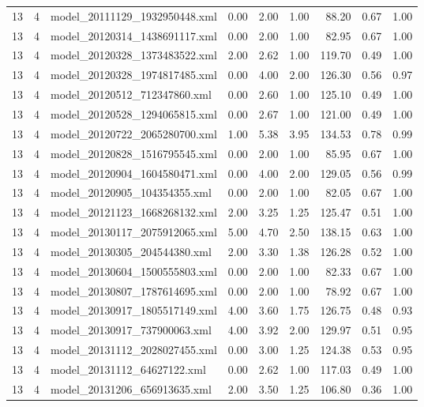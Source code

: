 \begin{table}[ht]
\begin{tabular}{rrlrrrrrr}
   13 &   4 & model\_20111129\_1932950448.xml & 0.00 & 2.00 & 1.00 & 88.20 & 0.67 & 1.00 \\ 
   13 &   4 & model\_20120314\_1438691117.xml & 0.00 & 2.00 & 1.00 & 82.95 & 0.67 & 1.00 \\ 
   13 &   4 & model\_20120328\_1373483522.xml & 2.00 & 2.62 & 1.00 & 119.70 & 0.49 & 1.00 \\ 
   13 &   4 & model\_20120328\_1974817485.xml & 0.00 & 4.00 & 2.00 & 126.30 & 0.56 & 0.97 \\ 
   13 &   4 & model\_20120512\_712347860.xml & 0.00 & 2.60 & 1.00 & 125.10 & 0.49 & 1.00 \\ 
   13 &   4 & model\_20120528\_1294065815.xml & 0.00 & 2.67 & 1.00 & 121.00 & 0.49 & 1.00 \\ 
   13 &   4 & model\_20120722\_2065280700.xml & 1.00 & 5.38 & 3.95 & 134.53 & 0.78 & 0.99 \\ 
   13 &   4 & model\_20120828\_1516795545.xml & 0.00 & 2.00 & 1.00 & 85.95 & 0.67 & 1.00 \\ 
   13 &   4 & model\_20120904\_1604580471.xml & 0.00 & 4.00 & 2.00 & 129.05 & 0.56 & 0.99 \\ 
   13 &   4 & model\_20120905\_104354355.xml & 0.00 & 2.00 & 1.00 & 82.05 & 0.67 & 1.00 \\ 
   13 &   4 & model\_20121123\_1668268132.xml & 2.00 & 3.25 & 1.25 & 125.47 & 0.51 & 1.00 \\ 
   13 &   4 & model\_20130117\_2075912065.xml & 5.00 & 4.70 & 2.50 & 138.15 & 0.63 & 1.00 \\ 
   13 &   4 & model\_20130305\_204544380.xml & 2.00 & 3.30 & 1.38 & 126.28 & 0.52 & 1.00 \\ 
   13 &   4 & model\_20130604\_1500555803.xml & 0.00 & 2.00 & 1.00 & 82.33 & 0.67 & 1.00 \\ 
   13 &   4 & model\_20130807\_1787614695.xml & 0.00 & 2.00 & 1.00 & 78.92 & 0.67 & 1.00 \\ 
   13 &   4 & model\_20130917\_1805517149.xml & 4.00 & 3.60 & 1.75 & 126.75 & 0.48 & 0.93 \\ 
   13 &   4 & model\_20130917\_737900063.xml & 4.00 & 3.92 & 2.00 & 129.97 & 0.51 & 0.95 \\ 
   13 &   4 & model\_20131112\_2028027455.xml & 0.00 & 3.00 & 1.25 & 124.38 & 0.53 & 0.95 \\ 
   13 &   4 & model\_20131112\_64627122.xml & 0.00 & 2.62 & 1.00 & 117.03 & 0.49 & 1.00 \\ 
   13 &   4 & model\_20131206\_656913635.xml & 2.00 & 3.50 & 1.25 & 106.80 & 0.36 & 1.00 \\ 

\end{tabular}
\end{table}
